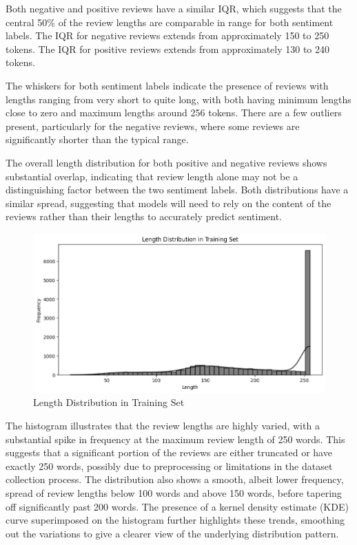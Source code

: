 \documentclass{article}
\begin{document}
Both negative and positive reviews have a similar IQR, which suggests that the central 50\% of the review lengths are comparable in range for both sentiment labels.
The IQR for negative reviews extends from approximately 150 to 250 tokens.
The IQR for positive reviews extends from approximately 130 to 240 tokens.

The whiskers for both sentiment labels indicate the presence of reviews with lengths ranging from very short to quite long, with both having minimum lengths close to zero and maximum lengths around 256 tokens.
There are a few outliers present, particularly for the negative reviews, where some reviews are significantly shorter than the typical range.

The overall length distribution for both positive and negative reviews shows substantial overlap, indicating that review length alone may not be a distinguishing factor between the two sentiment labels.
Both distributions have a similar spread, suggesting that models will need to rely on the content of the reviews rather than their lengths to accurately predict sentiment.

\begin{figure}[H]
    \centering
    \includegraphics[width=\textwidth]{figs/lengthimdb.png}
    \caption{Length Distribution in Training Set}
    \label{fig:lengthimdb}
\end{figure}
The histogram illustrates that the review lengths are highly varied, with a substantial spike in frequency at the maximum review length of 250 words. This suggests that a significant portion of the reviews are either truncated or have exactly 250 words, possibly due to preprocessing or limitations in the dataset collection process.
The distribution also shows a smooth, albeit lower frequency, spread of review lengths below 100 words and above 150 words, before tapering off significantly past 200 words. The presence of a kernel density estimate (KDE) curve superimposed on the histogram further highlights these trends, smoothing out the variations to give a clearer view of the underlying distribution pattern.
\end{document}
